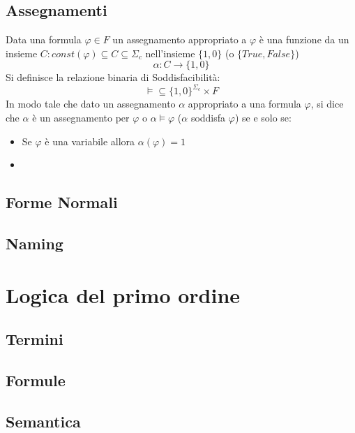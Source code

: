 \documentclass[./main.tex]{subfiles}
\begin{document}



\subsection{Assegnamenti}

Data una formula $\varphi \in F$ un assegnamento appropriato a $\varphi$ è una funzione 
da un insieme $C : const(\varphi) \subseteq C \subseteq \Sigma_c$ nell'insieme $\{1, 0\}$ (o $\{True, False\}$)
$$ \alpha : C \rightarrow \{1, 0\} $$
Si definisce la relazione binaria di Soddisfacibilità: 
$$\models \subseteq \{1, 0\}^{\Sigma_c} \times F$$
In modo tale che dato un assegnamento $\alpha$ appropriato a una formula $\varphi$, si dice che $\alpha$ è un assegnamento 
per $\varphi$ o $\alpha \models \varphi$ ($\alpha$ soddisfa $\varphi$) se e solo se:

\begin{itemize}
  \item Se $\varphi$ è una variabile allora $\alpha(\varphi) = 1$
  \item 
\end{itemize}


    \subsection{Forme Normali}
    \subsection{Naming}

\section{Logica del primo ordine}
    \subsection{Termini}
    \subsection{Formule}
    \subsection{Semantica}
\end{document}
